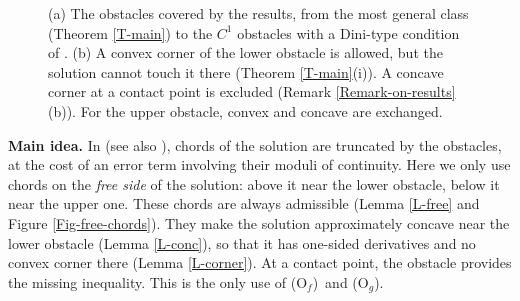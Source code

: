 \documentclass[reqno,12pt]{amsart}
\numberwithin{equation}{section}
\def\Of{{\sf (O$_f$)}}
\def\Og{{\sf (O$_g$)}}
\theoremstyle{remark}
\begin{document}
\begin{figure}[htbp]
\caption{(a) The obstacles covered by the results, from the most general class (Theorem \ref{T-main}) to the $C^1$ obstacles with a Dini-type condition of \cite{mandallena18}. (b) A convex corner of the lower obstacle is allowed, but the solution cannot touch it there (Theorem \ref{T-main}(i)). A concave corner at a contact point is excluded (Remark \ref{Remark-on-results}(b)). For the upper obstacle, convex and concave are exchanged.}\label{Fig-results}
\end{figure}


\medskip

{\bf Main idea.} In \cite{mandallena18} (see also \cite{gratwick-sychev19}), chords of the solution are truncated by the obstacles, at the cost of an error term involving their moduli of continuity. Here we only use chords on the {\em free side} of the solution: above it near the lower obstacle, below it near the upper one. These chords are always admissible (Lemma \ref{L-free} and Figure \ref{Fig-free-chords}). They make the solution approximately concave near the lower obstacle (Lemma \ref{L-conc}), so that it has one-sided derivatives and no convex corner there (Lemma \ref{L-corner}). At a contact point, the obstacle provides the missing inequality. This is the only use of \Of\ and \Og.
\end{document}
